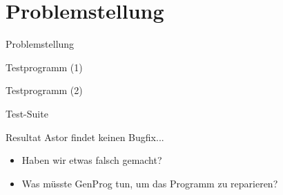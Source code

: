 \section{Problemstellung}
%
\begin{frame}{}
	\begin{center}
		\huge{Problemstellung}
	\end{center}
\end{frame}
%
\begin{frame}{Testprogramm (1)}
	\begin{figure}
		\begin{center}
			\scalebox{0.74}{
				\begin{minipage}{25em}
					
				\end{minipage}
			}
		\end{center}
	\end{figure}
\end{frame}
%
\begin{frame}{Testprogramm (2)}
	\begin{figure}
		\begin{center}
	\end{center}
	\end{figure}
\end{frame}
%
\begin{frame}{Test-Suite}
	\begin{figure}
			\scalebox{0.76}{
				
			}
	\end{figure}
\end{frame}
%
\begin{frame}{Resultat}
	Astor findet keinen Bugfix...
	\begin{figure}
	\end{figure}
\end{frame}
%
\begin{frame}{}
	\begin{itemize}
		\item Haben wir etwas falsch gemacht?
		\item Was müsste GenProg tun, um das Programm zu reparieren?
	\end{itemize}
\end{frame}
